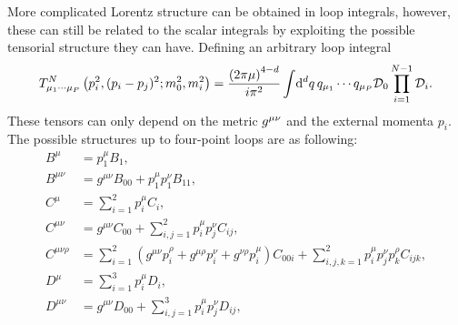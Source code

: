 \documentclass[../main.tex]{subfiles}
\begin{document}
More complicated Lorentz structure can be obtained in loop integrals, however,
these can still be related to the scalar integrals by exploiting the possible
tensorial structure they can have. Defining an arbitrary loop integral
\begin{equation}
    T^N_{\mu_1\cdots\mu_P}\left(p_i^2, (p_i-p_j)^2; m_0^2, m_i^2\right) = \frac{\left(2\pi \mu\right)^{4-d}}{i \pi^2} \int \!\mathrm{d}^d q\, q_{\mu_1}\cdots q_{\mu_P} \mathcal{D}_0 \prod_{i=1}^{N-1} \mathcal{D}_i.
\end{equation}
These tensors can only depend on the metric \(\tensor{g}{^\mu^\nu}\) and the external momenta \(p_i\).
The possible structures up to four-point loops are as following:
\begin{subequations}
    \begin{align}
        B^\mu                & = p_1^\mu B_1,                                                                                                                                                                                                         \\
        B^{\mu\nu}           & = g^{\mu\nu} B_{00} + p_1^\mu p_1^\nu B_{11},                                                                                                                                                                          \\
        C^\mu                & = \sum_{i=1}^2 p_i^\mu C_i,                                                                                                                                                                                            \\
        C^{\mu\nu}           & = g^{\mu\nu} C_{00} + \sum_{i,j=1}^{2} p_i^\mu p_j^\nu C_{ij},                                                                                                                                                         \\
        C^{\mu\nu\rho}       & = \sum_{i=1}^2 (g^{\mu\nu} p_i^{\rho} + g^{\mu\rho} p_i^{\nu} + g^{\nu\rho} p_i^{\mu}) C_{00i} + \sum_{i,j,k=1}^2 p_i^\mu p_j^\nu p_k^\rho C_{ijk},                                                                    \\
        D^\mu                & = \sum_{i=1}^3 p_i^\mu D_i,                                                                                                                                                                                            \\
        D^{\mu\nu}           & = g^{\mu\nu} D_{00} + \sum_{i,j=1}^{3} p_i^\mu p_j^\nu D_{ij},                                                                                                                                                         \\

\end{align}
\end{subequations}
\end{document}

